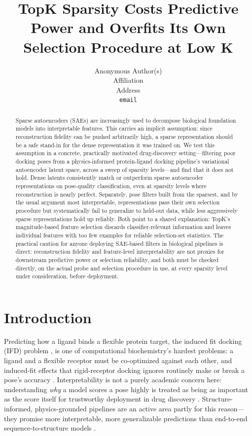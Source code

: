 \documentclass{article}
\title{TopK Sparsity Costs Predictive Power and Overfits Its Own Selection Procedure at Low K}
\author{%
  Anonymous Author(s) \\
  Affiliation \\
  Address \\
  \texttt{email} \\
}
\begin{document}
\maketitle

\begin{abstract}
Sparse autoencoders (SAEs) are increasingly used to decompose biological foundation models into interpretable features. This carries an implicit assumption: since reconstruction fidelity can be pushed arbitrarily high, a sparse representation should be a safe stand-in for the dense representation it was trained on. We test this assumption in a concrete, practically motivated drug-discovery setting---filtering poor docking poses from a physics-informed protein-ligand docking pipeline's variational autoencoder latent space, across a sweep of sparsity levels---and find that it does not hold. Dense latents consistently match or outperform sparse autoencoder representations on pose-quality classification, even at sparsity levels where reconstruction is nearly perfect. Separately, pose filters built from the sparsest, and by the usual argument most interpretable, representations pass their own selection procedure but systematically fail to generalize to held-out data, while less aggressively sparse representations hold up reliably. Both point to a shared explanation: TopK's magnitude-based feature selection discards classifier-relevant information and leaves individual features with too few examples for reliable selection-set statistics. The practical caution for anyone deploying SAE-based filters in biological pipelines is direct: reconstruction fidelity and feature-level interpretability are not proxies for downstream predictive power or selection reliability, and both must be checked directly, on the actual probe and selection procedure in use, at every sparsity level under consideration, before deployment.
\end{abstract}

\section{Introduction}

Predicting how a ligand binds a flexible protein target, the induced fit docking (IFD) problem \citep{sherman2006}, is one of computational biochemistry's hardest problems: a ligand and a flexible receptor must be co-optimized against each other, and induced-fit effects that rigid-receptor docking ignores routinely make or break a pose's accuracy \citep{miller2021}. Interpretability is not a purely academic concern here: understanding \emph{why} a model scores a pose highly is treated as being as important as the score itself for trustworthy deployment in drug discovery \citep{dhakal2022,sim2025,qadri2025}. Structure-informed, physics-grounded pipelines are an active area partly for this reason---they promise more interpretable, more generalizable predictions than end-to-end sequence-to-structure models \citep{wu2025,lam2025,jiang2026}.
\end{document}
